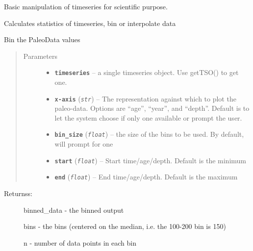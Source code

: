 \documentclass[letterpaper,10pt,english]{sphinxmanual}
\begin{document}
\begin{fulllineitems}
\label{Basic:pyleoclim.Basic}
Basic manipulation of timeseries for scientific purpose.

Calculates statistics of timeseries, bin or interpolate data

\begin{fulllineitems}
\label{Basic:pyleoclim.Basic.bin_Ts}
Bin the PaleoData values
\begin{quote}\begin{description}
\item[{Parameters}] \leavevmode\begin{itemize}
\item {} 
\textbf{\texttt{timeseries}} -- a single timeseries object. Use getTSO() to get one.

\item {} 
\textbf{\texttt{x-axis}} (\emph{\texttt{str}}) -- The representation against which to plot the
paleo-data. Options are ``age'', ``year'', and ``depth''. Default
is to let the system choose if only one available or prompt
the user.

\item {} 
\textbf{\texttt{bin\_size}} (\emph{\texttt{float}}) -- the size of the bins to be used.
By default, will prompt for one

\item {} 
\textbf{\texttt{start}} (\emph{\texttt{float}}) -- Start time/age/depth. Default is the minimum

\item {} 
\textbf{\texttt{end}} (\emph{\texttt{float}}) -- End time/age/depth. Default is the maximum

\end{itemize}

\end{description}\end{quote}
\begin{description}
\item[{Returnss:}] \leavevmode
binned\_data - the binned output

bins - the bins (centered on the median, i.e. the 100-200 bin is 150)

n - number of data points in each bin


\end{description}
\end{fulllineitems}
\end{fulllineitems}
\end{document}

